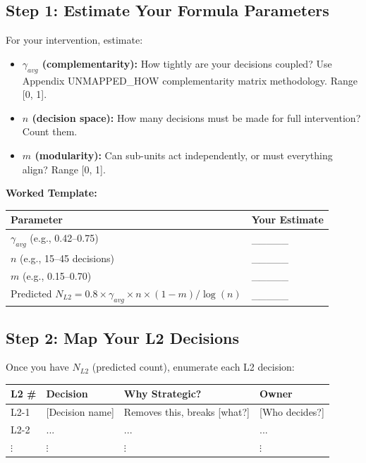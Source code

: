 \documentclass[11pt, a4paper]{article}
\begin{document}
\subsection{Step 1: Estimate Your Formula Parameters} \label{sec:ch15-part3a}

For your intervention, estimate:

\begin{itemize}[nosep]
    \item \textbf{$\gamma_{avg}$ (complementarity):} How tightly are your decisions coupled? Use Appendix UNMAPPED_HOW complementarity matrix methodology. Range [0, 1].

    \item \textbf{$n$ (decision space):} How many decisions must be made for full intervention? Count them.

    \item \textbf{$m$ (modularity):} Can sub-units act independently, or must everything align? Range [0, 1].
\end{itemize}

\textbf{Worked Template:}

\begin{center}
\begin{tabular}{|l|l|}
\hline
\textbf{Parameter} & \textbf{Your Estimate} \\
\hline
$\gamma_{avg}$ (e.g., 0.42--0.75) & \_\_\_\_\_ \\
\hline
$n$ (e.g., 15--45 decisions) & \_\_\_\_\_ \\
\hline
$m$ (e.g., 0.15--0.70) & \_\_\_\_\_ \\
\hline
Predicted $N_{L2} = 0.8 \times \gamma_{avg} \times n \times (1-m) / \log(n)$ & \_\_\_\_\_ \\
\hline
\end{tabular}
\end{center}

\subsection{Step 2: Map Your L2 Decisions} \label{sec:ch15-part3b}

Once you have $N_{L2}$ (predicted count), enumerate each L2 decision:

\begin{center}
\begin{tabular}{|l|l|l|l|}
\hline
\textbf{L2 \#} & \textbf{Decision} & \textbf{Why Strategic?} & \textbf{Owner} \\
\hline
L2-1 & [Decision name] & Removes this, breaks [what?] & [Who decides?] \\
\hline
L2-2 & ... & ... & ... \\
\hline
$\vdots$ & $\vdots$ & $\vdots$ & $\vdots$ \\
\hline
\end{tabular}
\end{center}
\end{document}
